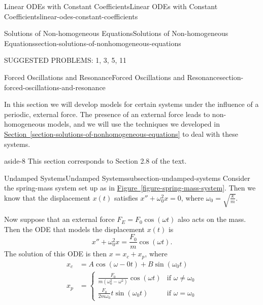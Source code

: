 \documentclass[oneside,10pt,]{book}
\numberwithin{equation}{section}
\newcommand{\amp}{&}
\begin{document}
\begin{chapterptx}{Linear ODEs with Constant Coefficients}{}{Linear ODEs with Constant Coefficients}{}{}{linear-odes-constant-coefficients}
\begin{sectionptx}{Solutions of Non-homogeneous Equations}{}{Solutions of Non-homogeneous Equations}{}{}{section-solutions-of-nonhomogeneous-equations}
\begin{conclusion}{}
\hypertarget{p-245}{}%
SUGGESTED PROBLEMS: 1, 3, 5, 11%
\end{conclusion}%
\end{sectionptx}
%
%
\typeout{************************************************}
\typeout{************************************************}
%
\begin{sectionptx}{Forced Oscillations and Resonance}{}{Forced Oscillations and Resonance}{}{}{section-forced-oscillations-and-resonance}
\begin{introduction}{}%
\hypertarget{p-246}{}%
In this section we will develop models for certain systems under the influence of a periodic, external force. The presence of an external force leads to non-homogeneous models, and we will use the techniques we developed in \hyperref[section-solutions-of-nonhomogeneous-equations]{Section~\ref{section-solutions-of-nonhomogeneous-equations}} to deal with these systems.%
\end{introduction}%
\begin{aside}{}{aside-8}%
\hypertarget{p-247}{}%
This section corresponds to Section 2.8 of the text.%
\end{aside}
%
%
\typeout{************************************************}
\typeout{************************************************}
%
\begin{subsectionptx}{Undamped Systems}{}{Undamped Systems}{}{}{subsection-undamped-systems}
\hypertarget{p-248}{}%
Consider the spring-mass system set up as in \hyperref[figure-spring-mass-system]{Figure~\ref{figure-spring-mass-system}}. Then we know that the displacement \(x(t)\) satisfies \(x'' + \omega_{0}^{2}x = 0\), where \(\omega_{0} = \sqrt{\frac{k}{m}}\).%
\par
\hypertarget{p-249}{}%
Now suppose that an external force \(F_{E} = F_{0}\cos(\omega t)\) also acts on the mass. Then the ODE that models the displacement \(x(t)\) is%
\begin{equation*}
x'' + \omega_{0}^{2}x = \frac{F_{0}}{m}\cos(\omega t).
\end{equation*}
The solution of this ODE is then \(x = x_{c} + x_{p}\), where%
\begin{align*}
x_{c} \amp= A\cos(\omega-{0}t) + B\sin(\omega_{0}t)\\
x_{p} \amp= \begin{cases} \frac{F_{0}}{m(\omega_{0}^{2} - \omega^{2})} \cos(\omega t) \amp\text{if }\omega\neq\omega_{0} \\ \frac{F_{0}}{2m\omega_{0}} t\sin(\omega_{0} t) \amp\text{if }\omega=\omega_{0} \end{cases}

\end{align*}
\end{subsectionptx}
\end{sectionptx}
\end{chapterptx}
\end{document}
